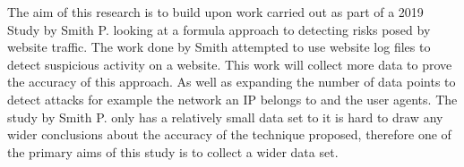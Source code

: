 The aim of this research is to build upon work carried out as part of a 2019 Study by Smith P. looking at a  formula approach to detecting risks posed by website traffic. The work done by Smith attempted to use website log files to detect suspicious activity on a website. This work will collect more data to prove the accuracy of this approach. As well as expanding the number of data points to detect attacks for example the network an IP belongs to and the user agents. The study by Smith P. only has a relatively small data set to it is hard to draw any wider conclusions about the accuracy of the technique proposed, therefore one of the primary aims of this study is to collect a wider data set. 